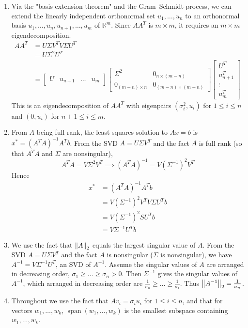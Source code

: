 \documentclass{article}
\def\mbb#1{\mathbb{#1}}
\def\bR{\mbb{R}}
\newcommand{\sbr}[1]{\left[#1\right]}
\newcommand{\arr}[3][\sbr]{#1{\begin{array}{#2}#3\end{array}}}
\DeclareMathOperator{\Span}{span}
\newcommand{\s}{\sigma}
\renewcommand{\S}{\Sigma}
\newcommand{\inv}{^{-1}}
\newcommand{\imp}{\implies}
\begin{document}
\begin{enumerate}
\begin{enumerate}
		
		
		\item Via the "basis extension theorem" and the Gram--Schmidt process, we can extend the linearly independent orthonormal set $u_1,\dots,u_n$ to an orthonormal basis $u_1,\dots,u_n,u_{n+1},\dots,u_m$ of $\bR^m$. Since $AA^T$ is $m\times m$, it requires an $m\times m$ eigendecomposition.
		\begin{align*}
			AA^T &= U\S V^TV\S U^T \\
			&= U\S^2U^T \\
			&= \arr{c|c|c|c}{U & u_{n+1} & \dots & u_m}
				\arr{c|c}{
				\S^2 & 0_{n\times(m-n)} \\
				\hline
				0_{(m-n)\times n} & 0_{(m-n)\times(m-n)}
				}
				\arr{c}{U^T \\ \hline u_{n+1}^T \\ \hline \vdots \\ \hline u_m^T}			
		\end{align*}
		This is an eigendecomposition of $AA^T$ with eigenpairs $(\s_i^2,u_i)$ for $1\le i\le n$ and $(0,u_i)$ for $n+1\le i\le m$.
		
		
		
		\item From $A$ being full rank, the least squares solution to $Ax=b$ is $x^*=(A^TA)\inv A^Tb$. From the SVD $A=U\S V^T$ and the fact $A$ is full rank (so that $A^TA$ and $\S$ are nonsingular),
		\[A^TA = V\S^2V^T
		\imp (A^TA)\inv = V(\S\inv)^2 V^T\]
		Hence
		\begin{align*}
			x^* &= (A^TA)\inv A^Tb \\
			&= V(\S\inv)^2 V^TV\S U^Tb \\
			&= V(\S\inv)^2SU^Tb \\
			&= V\S\inv U^Tb
		\end{align*}
		
		
		
		\item We use the fact that $\norm{A}_2$ equals the largest singular value of $A$. From the SVD $A=U\S V^T$ and the fact $A$ is nonsingular ($\S$ is nonsingular), we have $A\inv=V\S\inv U^T$, an SVD of $A\inv$. Assume the singular values of $A$ are arranged in decreasing order, $\s_1\ge\dots\ge\s_n>0$. Then $\S\inv$ gives the singular values of $A\inv$, which arranged in decreasing order are $\frac{1}{\s_n}\ge\dots\ge\frac{1}{\s_1}$. Thus $\norm{A\inv}_2=\frac{1}{\s_n}$.
		
		
		
		\item Throughout we use the fact that $Av_i=\s_iu_i$ for $1\le i\le n$, and that for vectors $w_1,\dots,w_k$, $\Span(w_1,\dots,w_k)$ is the smallest subspace containing $w_1,\dots,w_k$.
		

\end{enumerate}
\end{enumerate}
\end{document}

